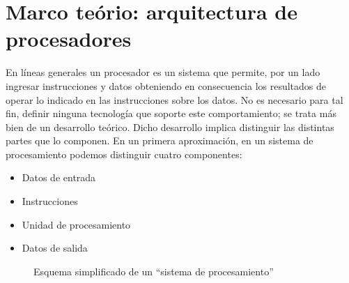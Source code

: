 \chapter{Marco teório: arquitectura de procesadores}

En líneas generales un procesador es un sistema que permite, por un lado ingresar instrucciones y datos obteniendo en consecuencia los resultados de operar lo indicado en las instrucciones sobre los datos. No es necesario para tal fin, definir ninguna tecnología que soporte este comportamiento; se trata más bien de un desarrollo teórico. Dicho desarrollo implica distinguir las distintas partes que lo componen. En un primera aproximación, en un sistema de procesamiento podemos distinguir cuatro componentes:

\begin{itemize}
  \item Datos de entrada
  \item Instrucciones
  \item Unidad de procesamiento
  \item Datos de salida
\end{itemize}

\begin{figure}
  \centering
  
  \captionsetup{justification=centering}
  \caption{Esquema simplificado de un ``sistema de procesamiento''}
  \label{fig:C02-sistema_de_procesamiento}
\end{figure}

